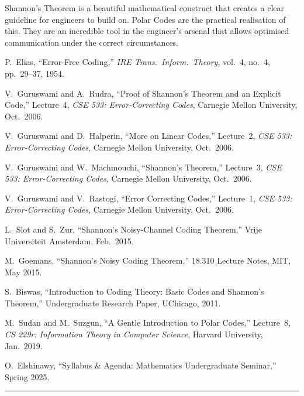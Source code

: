 Shannon's Theorem is a beautiful mathematical construct that creates a clear
guideline for engineers to build on.  Polar Codes are the practical
realisation of this.  They are an incredible tool in the engineer's arsenal
that allows optimised communication under the correct circumstances.

\articlereferences

\begin{enumerate}[label={[\arabic*]}, leftmargin=2em, itemsep=0.25em]

\item P.~Elias, ``Error-Free Coding,''
      \textit{IRE Trans.\ Inform.\ Theory}, vol.~4, no.~4,
      pp.~29--37, 1954.

\item V.~Guruswami and A.~Rudra, ``Proof of Shannon's Theorem and an
      Explicit Code,'' Lecture~4, \textit{CSE 533: Error-Correcting Codes},
      Carnegie Mellon University, Oct.\ 2006.

\item V.~Guruswami and D.~Halperin, ``More on Linear Codes,''
      Lecture~2, \textit{CSE 533: Error-Correcting Codes},
      Carnegie Mellon University, Oct.\ 2006.

\item V.~Guruswami and W.~Machmouchi, ``Shannon's Theorem,''
      Lecture~3, \textit{CSE 533: Error-Correcting Codes},
      Carnegie Mellon University, Oct.\ 2006.

\item V.~Guruswami and V.~Rastogi, ``Error Correcting Codes,''
      Lecture~1, \textit{CSE 533: Error-Correcting Codes},
      Carnegie Mellon University, Oct.\ 2006.

\item L.~Slot and S.~Zur, ``Shannon's Noisy-Channel Coding Theorem,''
      Vrije Universiteit Amsterdam, Feb.\ 2015.

\item M.~Goemans, ``Shannon's Noisy Coding Theorem,''
      18.310 Lecture Notes, MIT, May 2015.

\item S.~Biswas, ``Introduction to Coding Theory: Basic Codes and
      Shannon's Theorem,'' Undergraduate Research Paper, UChicago, 2011.

\item M.~Sudan and M.~Suzgun, ``A Gentle Introduction to Polar Codes,''
      Lecture~8, \textit{CS 229r: Information Theory in Computer Science},
      Harvard University, Jan.\ 2019.

\item O.~Elshinawy, ``Syllabus \& Agenda: Mathematics Undergraduate
      Seminar,'' Spring 2025.

\end{enumerate}

\vspace{0.15cm}

\noindent\textcolor{cmjgold}{\rule{\textwidth}{1.2pt}}

\vspace{0.6cm}

\newpage